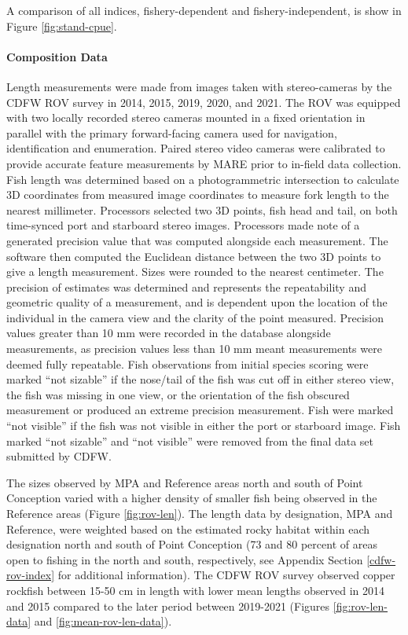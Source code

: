 \documentclass[11pt,
  english,
  letterpaper,
]{article}
\begin{document}
A comparison of all indices, fishery-dependent and fishery-independent, is show in Figure \ref{fig:stand-cpue}.

\hypertarget{composition-data-4}{%
\paragraph{Composition Data}\label{composition-data-4}}

\hfill\break

Length measurements were made from images taken with stereo-cameras by the CDFW ROV survey in 2014, 2015, 2019, 2020, and 2021. The ROV was equipped with two locally recorded stereo cameras mounted in a fixed orientation in parallel with the primary forward-facing camera used for navigation, identification and enumeration. Paired stereo video cameras were calibrated to provide accurate feature measurements by MARE prior to in-field data collection. Fish length was determined based on a photogrammetric intersection to calculate 3D coordinates from measured image coordinates to measure fork length to the nearest millimeter. Processors selected two 3D points, fish head and tail, on both time-synced port and starboard stereo images. Processors made note of a generated precision value that was computed alongside each measurement. The software then computed the Euclidean distance between the two 3D points to give a length measurement. Sizes were rounded to the nearest centimeter. The precision of estimates was determined and represents the repeatability and geometric quality of a measurement, and is dependent upon the location of the individual in the camera view and the clarity of the point measured. Precision values greater than 10 mm were recorded in the database alongside measurements, as precision values less than 10 mm meant measurements were deemed fully repeatable. Fish observations from initial species scoring were marked ``not sizable'' if the nose/tail of the fish was cut off in either stereo view, the fish was missing in one view, or the orientation of the fish obscured measurement or produced an extreme precision measurement. Fish were marked ``not visible'' if the fish was not visible in either the port or starboard image. Fish marked ``not sizable'' and ``not visible'' were removed from the final data set submitted by CDFW.

The sizes observed by MPA and Reference areas north and south of Point Conception varied with a higher density of smaller fish being observed in the Reference areas (Figure \ref{fig:rov-len}). The length data by designation, MPA and Reference, were weighted based on the estimated rocky habitat within each designation north and south of Point Conception (73 and 80 percent of areas open to fishing in the north and south, respectively, see Appendix Section \ref{cdfw-rov-index} for additional information). The CDFW ROV survey observed copper rockfish between 15-50 cm in length with lower mean lengths observed in 2014 and 2015 compared to the later period between 2019-2021 (Figures \ref{fig:rov-len-data} and \ref{fig:mean-rov-len-data}).
\end{document}
